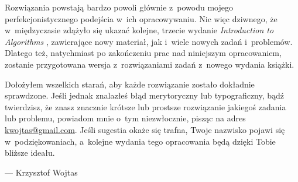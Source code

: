Rozwiązania powstają bardzo powoli głównie z~powodu mojego perfekcjonistycznego podejścia w~ich opracowywaniu.
Nic więc dziwnego, że w~międzyczasie zdążyło się ukazać kolejne, trzecie wydanie \textsl{Introduction to Algorithms} \cite{cormen3}, zawierające nowy materiał, jak i~wiele nowych zadań i~problemów.
Dlatego też, natychmiast po zakończeniu prac nad niniejszym opracowaniem, zostanie przygotowana wersja z~rozwiązaniami zadań z~nowego wydania książki.

Dołożyłem wszelkich starań, aby każde rozwiązanie zostało dokładnie sprawdzone.
Jeśli jednak znalazłeś błąd merytoryczny lub typograficzny, bądź twierdzisz, że znasz znacznie krótsze lub prostsze rozwiązanie jakiegoś zadania lub problemu, powiadom mnie o~tym niezwłocznie, pisząc na adres \url{kwojtas@gmail.com}.
Jeśli sugestia okaże się trafna, Twoje nazwisko pojawi się w~podziękowaniach, a~kolejne wydania tego opracowania będą dzięki Tobie bliższe ideału.

\bigskip
\bigskip
{}\hfill--- Krzysztof Wojtas
